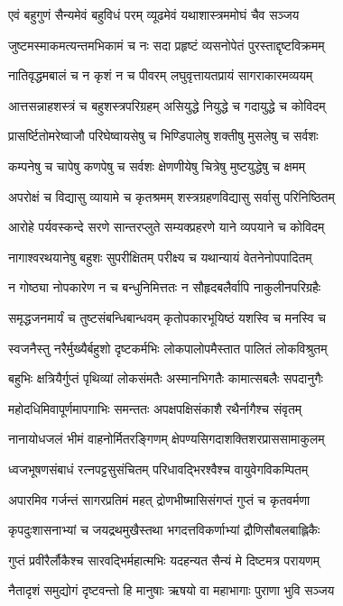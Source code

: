 \twolineshloka
{एवं बहुगुणं सैन्यमेवं बहुविधं परम्}
{व्यूढमेवं यथाशास्त्रममोघं चैव सञ्जय}


\twolineshloka
{जुष्टमस्माकमत्यन्तमभिकामं च नः सदा}
{प्रहृष्टं व्यसनोपेतं पुरस्ताद्दृष्टविक्रमम्}


\twolineshloka
{नातिवृद्धमबालं च न कृशं न च पीवरम्}
{लघुवृत्तायतप्रायं सागराकारमव्ययम्}


\twolineshloka
{आत्तसन्नाहशस्त्रं च बहुशस्त्रपरिग्रहम्}
{असियुद्धे नियुद्धे च गदायुद्धे च कोविदम्}


\twolineshloka
{प्रासर्ष्टितोमरेष्वाजौ परिघेष्वायसेषु च}
{भिण्डिपालेषु शक्तीषु मुसलेषु च सर्वशः}


\twolineshloka
{कम्पनेषु च चापेषु कणपेषु च सर्वशः}
{क्षेणणीयेषु चित्रेषु मुष्टयुद्धेषु च क्षमम्}


\twolineshloka
{अपरोक्षं च विद्यासु व्यायामे च कृतश्रमम्}
{शस्त्रग्रहणविद्यासु सर्वासु परिनिष्ठितम्}


\twolineshloka
{आरोहे पर्यवस्कन्दे सरणे सान्तरप्लुते}
{सम्यक्प्रहरणे याने व्यपयाने च कोविदम्}


\twolineshloka
{नागाश्वरथयानेषु बहुशः सुपरीक्षितम्}
{परीक्ष्य च यथान्यायं वेतनेनोपपादितम्}


\twolineshloka
{न गोष्ठ्या नोपकारेण न च बन्धुनिमित्ततः}
{न सौहृदबलैर्वापि नाकुलीनपरिग्रहैः}


\twolineshloka
{समृद्धजनमार्यं च तुष्टसंबन्धिबान्धवम्}
{कृतोपकारभूयिष्ठं यशस्वि च मनस्वि च}


\twolineshloka
{स्वजनैस्तु नरैर्मुख्यैर्बहुशो दृष्टकर्मभिः}
{लोकपालोपमैस्तात पालितं लोकविश्रुतम्}


\twolineshloka
{बहुभिः क्षत्रियैर्गुप्तं पृथिव्यां लोकसंमतैः}
{अस्मानभिगतैः कामात्सबलैः सपदानुगैः}


\twolineshloka
{महोदधिमिवापूर्णमापगाभिः समन्ततः}
{अपक्षपक्षिसंकाशै रथैर्नागैश्च संवृतम्}


\twolineshloka
{नानायोधजलं भीमं वाहनोर्मितरङ्गिणम्}
{क्षेपण्यसिगदाशक्तिशरप्राससामाकुलम्}


\twolineshloka
{ध्वजभूषणसंबाधं रत्नपट्टसुसंचितम्}
{परिधावद्भिरश्वैश्च वायुवेगविकम्पितम्}


\twolineshloka
{अपारमिव गर्जन्तं सागरप्रतिमं महत्}
{द्रोणभीष्मासिसंगप्तं गुप्तं च कृतवर्मणा}


\twolineshloka
{कृपदुःशासनाभ्यां च जयद्रथमुखैस्तथा}
{भगदत्तविकर्णाभ्यां द्रौणिसौबलबाह्लिकैः}


\twolineshloka
{गुप्तं प्रवीरैर्लौकैश्च सारवद्भिर्महात्मभिः}
{यदहन्यत सैन्यं मे दिष्टमत्र परायणम्}


\twolineshloka
{नैतादृशं समुद्योगं दृष्टवन्तो हि मानुषाः}
{ऋषयो वा महाभागाः पुराणा भुवि सञ्जय}



